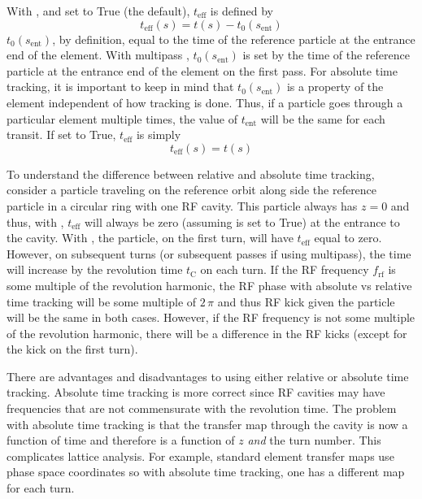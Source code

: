 With , and  set to True (the
default), $t_\text{eff}$ is defined by
\begin{equation}
  t_\text{eff}(s) = t(s) - t_0(s_\text{ent})
\end{equation}
$t_0(s_\text{ent})$, by definition, equal to the time of the reference particle at the entrance end
of the element. With multipass , $t_0(s_\text{ent})$ is set by the time of the
reference particle at the entrance end of the element on the first pass. For absolute time tracking,
it is important to keep in mind that $t_0(s_\text{ent})$ is a property of the element independent of
how tracking is done. Thus, if a particle goes through a particular element multiple times, the
value of $t_\text{ent}$ will be the same for each transit. If 
set to True, $t_\text{eff}$ is simply
\begin{equation}
  t_\text{eff}(s) = t(s) 
\end{equation}

To understand the difference between relative and absolute time tracking, consider a particle
traveling on the reference orbit along side the reference particle in a circular ring with one RF
cavity. This particle always has $z = 0$ and thus, with , $t_\text{eff}$
will always be zero (assuming  is set to True) at the entrance
to the cavity.  With , the particle, on the first turn, will have
$t_\text{eff}$ equal to zero. However, on subsequent turns (or subsequent passes if using
multipass), the time will increase by the revolution time $t_\text{C}$ on each turn. If the RF
frequency $f_\text{rf}$ is some multiple of the revolution harmonic, the RF phase with absolute vs
relative time tracking will be some multiple of $2 \, \pi$ and thus RF kick given the particle will
be the same in both cases. However, if the RF frequency is not some multiple of the revolution
harmonic, there will be a difference in the RF kicks (except for the kick on the first turn).

There are advantages and disadvantages to using either relative or absolute time tracking. Absolute
time tracking is more correct since RF cavities may have frequencies that are not commensurate with
the revolution time. The problem with absolute time tracking is that the transfer map through the
cavity is now a function of time and therefore is a function of $z$ {\em and} the turn number. This
complicates lattice analysis. For example, standard element transfer maps use phase space
coordinates so with absolute time tracking, one has a different map for each turn.


